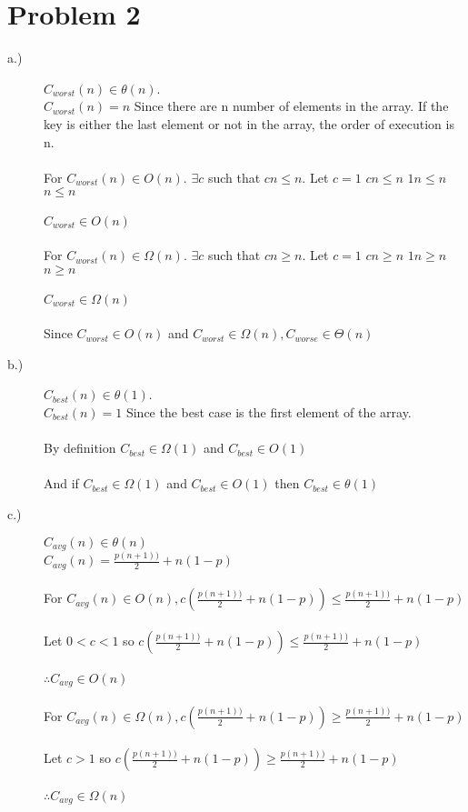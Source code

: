 \documentclass[12pt,letterpaper]{article}
\begin{document}
\section*{Problem 2}
\begin{description}
    \item [a.)]$C_{worst}(n) \in \theta(n)$.\\ 
    $C_{worst}(n) = n$ Since there are n number of elements in the array. If the key is either the last element or not in the array, the order of execution is n.\\\\
    For $C_{worst}(n) \in O(n)$.  $\exists c$ such that $cn \leq n$. 
    Let $c = 1$
    $cn \leq n$ \xrightarrow{} $1n \leq n$ \xrightarrow{} $n \leq n$\\\\
    \therefore $C_{worst} \in O(n)$\\\\
    For $C_{worst}(n) \in \Omega(n)$.  $\exists c$ such that $cn \geq n$. 
    Let $c = 1$
    $cn \geq n$ \xrightarrow{} $1n \geq n$ \xrightarrow{} $n \geq n$\\\\
    \therefore $C_{worst} \in \Omega(n)$\\\\
    Since $C_{worst} \in O(n)$ and $C_{worst} \in \Omega(n), C_{worse} \in \Theta(n)$\\
    
    \item [b.)] $C_{best}(n) \in \theta(1)$.\\
    $C_{best}(n) = 1$ Since the best case is the first element of the array.\\\\
    By definition $C_{best} \in \Omega(1)$ and $C_{best} \in O(1)$\\\\
    And if $C_{best} \in \Omega(1)$ and $C_{best} \in O(1)$ then $C_{best} \in \theta(1)$
    
    
    \item [c.)]$C_{avg}(n) \in \theta(n)$\\
    $C_{avg}(n) = \tfrac{p(n+1))}{2}+n(1-p)$\\\\
    For $C_{avg}(n) \in O(n), c(\tfrac{p(n+1))}{2}+n(1-p)) \leq \tfrac{p(n+1))}{2}+n(1-p)$\\\\
    Let $0 < c < 1$ so $c(\tfrac{p(n+1))}{2}+n(1-p)) \leq \tfrac{p(n+1))}{2}+n(1-p)$\\\\
    $\therefore C_{avg} \in O(n)$\\\\
    For $C_{avg}(n) \in \Omega(n), c(\tfrac{p(n+1))}{2}+n(1-p)) \geq \tfrac{p(n+1))}{2}+n(1-p)$\\\\
    Let $c > 1$ so $c(\tfrac{p(n+1))}{2}+n(1-p)) \geq \tfrac{p(n+1))}{2}+n(1-p)$\\\\
    $\therefore C_{avg} \in \Omega(n)$
    

\end{description}
\end{document}
